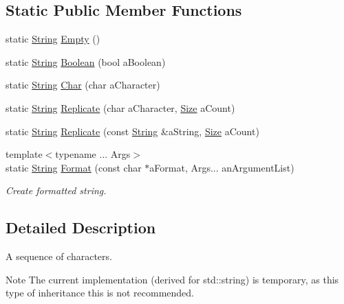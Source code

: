 \subsection*{Static Public Member Functions}
\begin{DoxyCompactItemize}
\item 
static \hyperlink{classlibrary_1_1core_1_1types_1_1_string}{String} \hyperlink{classlibrary_1_1core_1_1types_1_1_string_a4d359cb0dba46e14ca46f90e728c2b96}{Empty} ()
\item 
static \hyperlink{classlibrary_1_1core_1_1types_1_1_string}{String} \hyperlink{classlibrary_1_1core_1_1types_1_1_string_afd43951e5c53b89428dc36db99a83842}{Boolean} (bool a\+Boolean)
\item 
static \hyperlink{classlibrary_1_1core_1_1types_1_1_string}{String} \hyperlink{classlibrary_1_1core_1_1types_1_1_string_abbc5a795da1a72d1456ba4950e62602c}{Char} (char a\+Character)
\item 
static \hyperlink{classlibrary_1_1core_1_1types_1_1_string}{String} \hyperlink{classlibrary_1_1core_1_1types_1_1_string_ab476d0986c7d364261ee3e668890836c}{Replicate} (char a\+Character, \hyperlink{namespacelibrary_1_1core_1_1types_a701626ea1027888ebbb8cfd0ff7adab0}{Size} a\+Count)
\item 
static \hyperlink{classlibrary_1_1core_1_1types_1_1_string}{String} \hyperlink{classlibrary_1_1core_1_1types_1_1_string_a85504c430c0fdc58393f819205fedd49}{Replicate} (const \hyperlink{classlibrary_1_1core_1_1types_1_1_string}{String} \&a\+String, \hyperlink{namespacelibrary_1_1core_1_1types_a701626ea1027888ebbb8cfd0ff7adab0}{Size} a\+Count)
\item 
{\footnotesize template$<$typename ... Args$>$ }\\static \hyperlink{classlibrary_1_1core_1_1types_1_1_string}{String} \hyperlink{classlibrary_1_1core_1_1types_1_1_string_ae1745f54be6952d7b5a388239377b287}{Format} (const char $\ast$a\+Format, Args... an\+Argument\+List)
\begin{DoxyCompactList}\small\item\em Create formatted string. \end{DoxyCompactList}\end{DoxyCompactItemize}


\subsection{Detailed Description}
A sequence of characters. 

\begin{DoxyNote}{Note}
The current implementation (derived for std\+::string) is temporary, as this type of inheritance this is not recommended. 
\end{DoxyNote}


